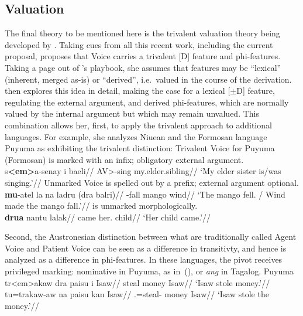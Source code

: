 	\subsection{Valuation} \label{i:agree:nie}
The final theory to be mentioned here is the trivalent valuation theory being developed by \cite{nie17}. Taking cues from all this recent work, including the current proposal, \citeauthor{nie17} proposes that Voice carries a trivalent [D] feature and phi-features. Taking a page out of \citeauthor{wurmbrandshimamura17}'s playbook, she assumes that features may be ``lexical'' (inherent, merged as-is) or ``derived'', i.e.~valued in the course of the derivation. \citeauthor{nie17} then explores this idea in detail, making the case for a lexical [$\pm$D] feature, regulating the external argument, and derived phi-features, which are normally valued by the internal argument but which may remain unvalued. This combination allows her, first, to apply the trivalent approach to additional languages. For example, she analyzes Niuean and the Formosan language Puyuma as exhibiting the trivalent distinction:
\pex\label{ex:puyuma}Trivalent Voice for Puyuma (Formosan)
	\a {\vd} is marked with an infix; obligatory external argument.\\
		\begingl
		\gla s\textbf{<em>}a-senay i baeli//
		\glb {<}AV>-sing  my.elder.sibling//
		\glft `My elder sister is/was singing.'//
	\endgl
	\a Unmarked Voice is spelled out by a prefix; external argument optional.\\
		\begingl
		\gla \textbf{mu}-atel la na ladru (dra balri)//
		\glb {}-fall   mango  wind//
		\glft `The mango fell. / Wind made the mango fall.'//
	\endgl
	\a {\vz} is unmarked morphologically.\\
		\begingl
		\gla \textbf{drua} nantu lalak//
		\glb came her. child//
		\glft `Her child came.'//
	\endgl
\xe

Second, the Austronesian distinction between what are traditionally called Agent Voice and Patient Voice can be seen as a difference in transitivty, and hence is analyzed as a difference in phi-features. In these languages, the pivot receives privileged marking: nominative in Puyuma, as in~(\nextx), or \emph{ang} in Tagalog.
\pex Puyuma \citep{nie17}
	\a \begingl
		\gla tr<em>akaw dra paisu i Isaw//
		\glb {<}steal  money  Isaw//
		\glft `Isaw stole money.'//
	\endgl
	\a \begingl
		\gla tu=trakaw-aw na paisu kan Isaw//
		.=steal-  money  Isaw//
		\glft `Isaw stole the money.'//
	\endgl
\xe

